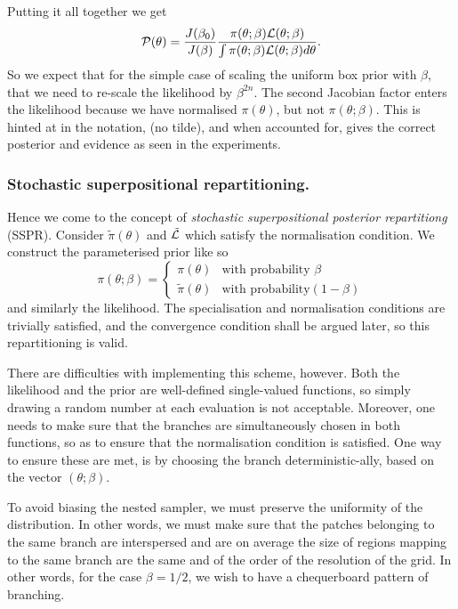 \documentclass[usenatbib]{mnras}
\begin{document}
Putting it all together we get 
\begin{equation}
 {\cal P}(\theta) = \frac{J(\beta_{0})}{J(\beta)} \frac{\pi(\theta; \beta) {\cal L}(\theta; \beta)}{\int \pi(\theta; \beta) {\cal L}(\theta; \beta) d \theta}.
\end{equation}
So we expect that for the simple case of scaling the uniform box
prior with \(\beta\), that we need to re-scale the likelihood by
\(\beta^{2n}\). The second Jacobian factor enters the likelihood because
we have normalised \(\pi(\theta)\), but not \(\pi(\theta; \beta)\). This is hinted at in
the notation, (no tilde), and when accounted for, gives  the correct
posterior and evidence as seen in the experiments. 


\subsubsection{Stochastic superpositional repartitioning.}
\label{sec:org1dcbac6}

Hence we come to the concept of \emph{stochastic superpositional
posterior repartitiong} (SSPR). Consider \(\tilde{\pi}(\theta)\) and
\({\cal \tilde{L}}\) which satisfy the normalisation
condition. We construct the parameterised prior like so
\begin{equation}
  \pi(\theta; \beta)  = \begin{cases}
	\pi(\theta) & \text{with probability } \beta\\
	\tilde{\pi}(\theta) & \text{with probability} (1- \beta)
	\end{cases}
\end{equation}
and similarly the likelihood.  The specialisation and
normalisation conditions are trivially satisfied, and the
convergence condition shall be argued later, so this
repartitioning is valid.

There are difficulties with implementing this scheme,
however. Both the likelihood and the prior are well-defined
single-valued functions, so simply drawing a random number at each
evaluation is not acceptable. Moreover, one needs to make sure
that the branches are simultaneously chosen in both functions, so
as to ensure that the normalisation condition is satisfied. One
way to ensure these are met, is by choosing the branch
deterministic-ally, based on the vector \((\theta; \beta)\). 

To avoid biasing the nested sampler, we must preserve the
uniformity of the distribution. In other words, we must make sure
that the patches belonging to the same branch are interspersed and
are on average the size of regions mapping to the same branch are
the same and of the order of the resolution of the grid. In other
words, for the case \(\beta=1/2\), we wish to have a chequerboard
pattern of branching. 
\end{document}
